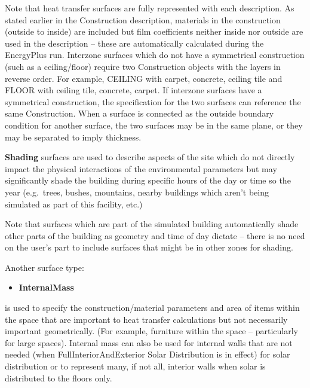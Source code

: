 \begin{callout}
Note that heat transfer surfaces are fully represented with each description. As stated earlier in the Construction description, materials in the construction (outside to inside) are included but film coefficients neither inside nor outside are used in the description -- these are automatically calculated during the EnergyPlus run. Interzone surfaces which do not have a symmetrical construction (such as a ceiling/floor) require two Construction objects with the layers in reverse order. For example, CEILING with carpet, concrete, ceiling tile and FLOOR with ceiling tile, concrete, carpet. If interzone surfaces have a symmetrical construction, the specification for the two surfaces can reference the same Construction. When a surface is connected as the outside boundary condition for another surface, the two surfaces may be in the same plane, or they may be separated to imply thickness.
\end{callout}

\textbf{Shading} surfaces are used to describe aspects of the site which do not directly impact the physical interactions of the environmental parameters but may significantly shade the building during specific hours of the day or time so the year (e.g.~trees, bushes, mountains, nearby buildings which aren't being simulated as part of this facility, etc.)

\begin{callout}
Note that surfaces which are part of the simulated building automatically shade other parts of the building as geometry and time of day dictate -- there is no need on the user's part to include surfaces that might be in other zones for shading.
\end{callout}

Another surface type:

\begin{itemize}
\tightlist
\item
  \textbf{InternalMass}
\end{itemize}

is used to specify the construction/material parameters and area of items within the space that are important to heat transfer calculations but not necessarily important geometrically. (For example, furniture within the space -- particularly for large spaces). Internal mass can also be used for internal walls that are not needed (when FullInteriorAndExterior Solar Distribution is in effect) for solar distribution or to represent many, if not all, interior walls when solar is distributed to the floors only.

